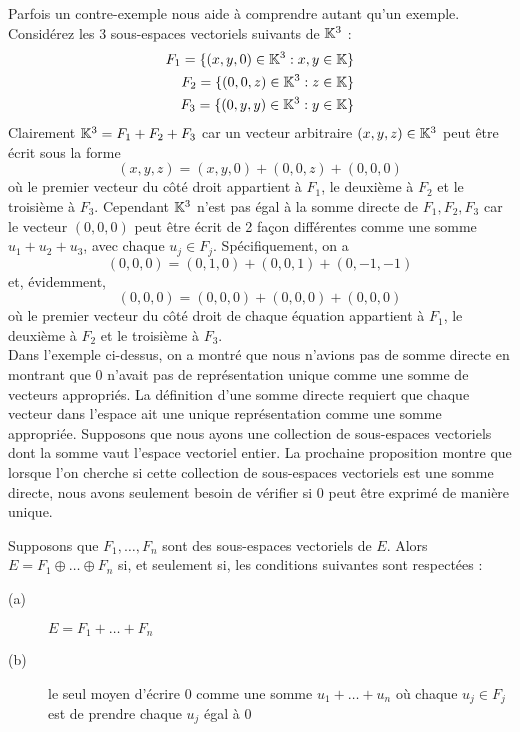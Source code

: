 \documentclass[12pt]{book}
\theoremstyle{plain}
\begin{document}
Parfois un contre-exemple nous aide à comprendre autant qu'un exemple. Considérez les 3 sous-espaces vectoriels suivants de $\mathbb{K}^3$ :
\begin{eqnarray*}
    F_1=\{(x,y,0)\in\mathbb{K}^3:x,y\in\mathbb{K}\}\\
    F_2=\{(0,0,z)\in\mathbb{K}^3:z\in\mathbb{K}\}\\
    F_3=\{(0,y,y)\in\mathbb{K}^3:y\in\mathbb{K}\}\\
\end{eqnarray*}
Clairement $\mathbb{K}^3=F_1+F_2+F_3$ car un vecteur arbitraire $(x,y,z)\in\mathbb{K}^3$ peut être écrit sous la forme
\begin{equation*}
    (x,y,z)=(x,y,0)+(0,0,z)+(0,0,0)
\end{equation*}
où le premier vecteur du côté droit appartient à $F_1$, le deuxième à $F_2$ et le troisième à $F_3$. Cependant $\mathbb{K}^3$ n'est pas égal à la somme directe de $F_1,F_2,F_3$ car le vecteur $(0,0,0)$ peut être écrit de 2 façon différentes comme une somme $u_1+u_2+u_3$, avec chaque $u_j\in F_j$. Spécifiquement, on a
\begin{equation*}
    (0,0,0)=(0,1,0)+(0,0,1)+(0,-1,-1)
\end{equation*}
et, évidemment,
\begin{equation*}
    (0,0,0)=(0,0,0)+(0,0,0)+(0,0,0)
\end{equation*}
où le premier vecteur du côté droit de chaque équation appartient à $F_1$, le deuxième à $F_2$ et le troisième à $F_3$.\\
\indent
Dans l'exemple ci-dessus, on a montré que nous n'avions pas de somme directe en montrant que 0 n'avait pas de représentation unique comme une somme de vecteurs appropriés. La définition d'une somme directe requiert que chaque vecteur dans l'espace ait une unique représentation comme une somme appropriée. Supposons que nous ayons une collection de sous-espaces vectoriels dont la somme vaut l'espace vectoriel entier. La prochaine proposition montre que lorsque l'on cherche si cette collection de sous-espaces vectoriels est une somme directe, nous avons seulement besoin de vérifier si 0 peut être exprimé de manière unique.

\begin{prop}
    Supposons que $F_1,\ldots,F_n$ sont des sous-espaces vectoriels de $E$. Alors $E=F_1\oplus\ldots\oplus F_n$ si, et seulement si, les conditions suivantes sont respectées :
    \begin{description}
        \item[(a)] $ E=F_1+\ldots+F_n $
        \item[(b)] le seul moyen d'écrire 0 comme une somme $u_1+\ldots+u_n$ où chaque $u_j\in F_j$ est de prendre chaque $u_j$ égal à 0
    \end{description}
\end{prop}
\end{document}
